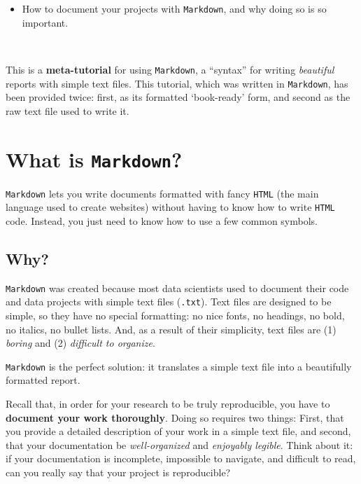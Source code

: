\documentclass[
]{book}
\providecommand{\tightlist}{%
  \setlength{\itemsep}{0pt}\setlength{\parskip}{0pt}}
\begin{document}
\begin{itemize}
\tightlist
\item
  How to document your projects with \texttt{Markdown}, and why doing so is so important.
\end{itemize}

~

This is a \textbf{meta-tutorial} for using \texttt{Markdown}, a ``syntax'' for writing
\emph{beautiful} reports with simple text files. This tutorial, which was written
in \texttt{Markdown}, has been provided twice: first, as its formatted `book-ready'
form, and second as the raw text file used to write it.

\hypertarget{what-is-markdown}{%
\section*{\texorpdfstring{What is \texttt{Markdown}?}{What is Markdown?}}\label{what-is-markdown}}

\texttt{Markdown} lets you write documents formatted with fancy \texttt{HTML} (the main
language used to create websites) without having to know how to write \texttt{HTML}
code. Instead, you just need to know how to use a few common symbols.

\hypertarget{why}{%
\subsection*{Why?}\label{why}}

\texttt{Markdown} was created because most data scientists used to document their
code and data projects with simple text files (\texttt{.txt}). Text files are designed
to be simple, so they have no special formatting: no nice fonts, no headings,
no bold, no italics, no bullet lists. And, as a result of their simplicity,
text files are (1) \emph{boring} and (2) \emph{difficult to organize}.

\texttt{Markdown} is the perfect solution: it translates a simple text file into a
beautifully formatted report.

Recall that, in order for your research to be truly reproducible, you have to
\textbf{document your work thoroughly}. Doing so requires two things: First, that
you provide a detailed description of your work in a simple text file, and
second, that your documentation be \emph{well-organized} and \emph{enjoyably legible}.
Think about it: if your documentation is incomplete, impossible to navigate,
and difficult to read, can you really say that your project is reproducible?
\end{document}
